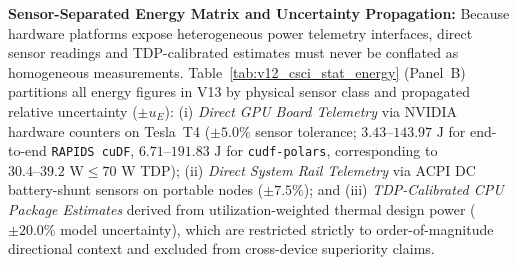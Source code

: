 \documentclass[10pt,a4paper]{article}
\begin{document}
\noindent\textbf{Sensor-Separated Energy Matrix and Uncertainty Propagation:} Because hardware platforms expose heterogeneous power telemetry interfaces, direct sensor readings and TDP-calibrated estimates must never be conflated as homogeneous measurements. Table~\ref{tab:v12_csci_stat_energy} (Panel~B) partitions all energy figures in V13 by physical sensor class and propagated relative uncertainty ($\pm u_{E}$): (i) \emph{Direct GPU Board Telemetry} via NVIDIA hardware counters on Tesla~T4 ($\pm 5.0\%$ sensor tolerance; $3.43\text{--}143.97\text{ J}$ for end-to-end \texttt{RAPIDS cuDF}, $6.71\text{--}191.83\text{ J}$ for \texttt{cudf-polars}, corresponding to $30.4\text{--}39.2\text{ W} \le 70\text{ W}$ TDP); (ii) \emph{Direct System Rail Telemetry} via ACPI DC battery-shunt sensors on portable nodes ($\pm 7.5\%$); and (iii) \emph{TDP-Calibrated CPU Package Estimates} derived from utilization-weighted thermal design power ($\pm 20.0\%$ model uncertainty), which are restricted strictly to order-of-magnitude directional context and excluded from cross-device superiority claims.
\end{document}
